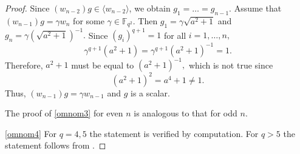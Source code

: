 \begin{proof}
  
Since $(w_{n-2})g \in \langle w_{n-2} \rangle$, we obtain $g_1= \ldots = g_{n-1}.$ Assume that $(w_{n-1})g= \gamma w_n$ for some $\gamma \in \mathbb{F}_{q^2}.$ Then $g_1= \gamma \sqrt{a^2+1} $ and $g_n= \gamma(\sqrt{a^2+1})^{-1}.$ Since $(g_i)^{q+1}=1$ for all $i=1, \ldots, n,$ 
$$\gamma^{q+1}(a^2+1)=\gamma^{q+1}(a^2+1)^{-1}=1.$$
Therefore, $a^2+1$ must be equal to $(a^2+1)^{-1},$ which is not true since $$(a^2+1)^2=a^4+1 \ne 1.$$
Thus, $(w_{n-1})g= \gamma w_{n-1}$ and $g$ is a scalar.

The proof of \eqref{omnom3} for even $n$ is  analogous to that for  odd $n$. 

\medskip

\eqref{omnom4} For $q=4,5$ the statement is verified by computation. For $q>5$ the statement follows from \cite[Table 2]{burness}.

\medskip








\end{proof}
